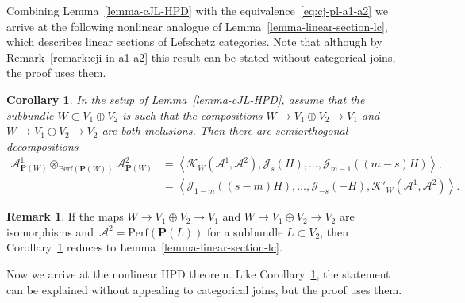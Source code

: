 \documentclass[11pt, reqno]{amsart}
\numberwithin{equation}{section}
\theoremstyle{plain}
\newtheorem{corollary}[theorem]{Corollary}
\theoremstyle{definition}
\newtheorem{remark}[theorem]{Remark}
\newcommand{\Perf}{\mathrm{Perf}}
\newcommand{\llangle}{\left \langle}
\newcommand{\rrangle}{\right \rangle}
\newcommand{\cA}{\mathcal{A}}
\newcommand{\cJ}{\mathcal{J}}
\newcommand{\cK}{\mathcal{K}}
\newcommand{\bP}{\mathbf{P}}
\begin{document}
Combining Lemma~\ref{lemma-cJL-HPD} with the equivalence~\eqref{eq:cj-pl-a1-a2} we arrive at the following
nonlinear analogue of Lemma~\ref{lemma-linear-section-lc}, which describes linear sections of Lefschetz categories. 
Note that although by Remark~\ref{remark:cji-in-a1-a2} 
this result can be stated without categorical joins, 
the proof uses them. 


\begin{corollary}
\label{corollary-fiber-product-lc}
In the setup of Lemma~\textup{\ref{lemma-cJL-HPD}}, 
assume that the subbundle $W \subset V_1 \oplus V_2$ is such that
the compositions $W \to V_1 \oplus V_2 \to V_1$ and $W \to V_1 \oplus V_2 \to V_2$ are both inclusions. 
Then there are semiorthogonal decompositions 
\begin{align*}
\cA^1_{\bP(W)} \otimes_{\Perf(\bP(W))} \cA^2_{\bP(W)} & = 
\llangle \cK_W(\cA^1, \cA^2), \cJ_s(H), \dots, \cJ_{m-1}((m-s)H) \rrangle ,    \\
& = 
\llangle 
\cJ_{1-m}((s-m)H), \dots, \cJ_{-s}(-H), \cK'_W(\cA^1, \cA^2) 
\rrangle . 
\end{align*}
\end{corollary}


\begin{remark}
If the maps $W \to V_1 \oplus V_2 \to V_1$ and $W \to V_1 \oplus V_2 \to V_2$ are isomorphisms 
and~$\cA^2 = \Perf(\bP(L))$ for a subbundle $L \subset V_2$, 
then Corollary~\ref{corollary-fiber-product-lc} reduces to Lemma~\ref{lemma-linear-section-lc}.  
\end{remark}


Now we arrive at the nonlinear HPD theorem. 
Like Corollary~\ref{corollary-fiber-product-lc}, the statement can be explained without appealing to categorical joins, 
but the proof uses them. 
\end{document}
